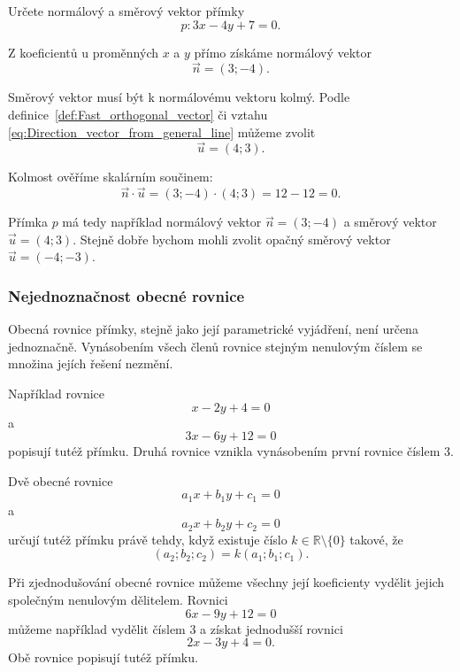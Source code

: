 \begin{example}\label{exa:Vectors_from_general_line}
    Určete normálový a směrový vektor přímky
    \[
        p: 3x-4y+7=0.
    \]

    Z koeficientů u proměnných $x$ a $y$ přímo získáme normálový
    vektor
    \[
        \vec{n}=(3;-4).
    \]

    Směrový vektor musí být k normálovému vektoru kolmý. 
    Podle definice~\ref{def:Fast_orthogonal_vector} 
    či vztahu \eqref{eq:Direction_vector_from_general_line} můžeme zvolit
    \[
        \vec{u}=(4;3).
    \]

    Kolmost ověříme skalárním součinem:
    \[
        \vec{n}\cdot\vec{u}
        =
        (3;-4)\cdot(4;3)
        =
        12-12
        =
        0.
    \]

    Přímka $p$ má tedy například normálový vektor
    $\vec{n}=(3;-4)$ a směrový vektor $\vec{u}=(4;3)$. Stejně dobře
    bychom mohli zvolit opačný směrový vektor $\vec{u}=(-4;-3)$.
\end{example}

\subsubsection{Nejednoznačnost obecné rovnice}
\label{subsubsec:Nonunique_general_line_equation}

Obecná rovnice přímky, stejně jako její parametrické vyjádření, není
určena jednoznačně. Vynásobením všech členů rovnice stejným nenulovým
číslem se množina jejích řešení nezmění.

Například rovnice
\[
    x-2y+4=0
\]
a
\[
    3x-6y+12=0
\]
popisují tutéž přímku. Druhá rovnice vznikla vynásobením první
rovnice číslem $3$.

Dvě obecné rovnice
\[
    a_1x+b_1y+c_1=0
\]
a
\[
    a_2x+b_2y+c_2=0
\]
určují tutéž přímku právě tehdy, když existuje číslo
$k\in\mathbb{R}\setminus\{0\}$ takové, že
\[
    (a_2;b_2;c_2)=k(a_1;b_1;c_1).
\]

\begin{remark}
    Při zjednodušování obecné rovnice můžeme všechny její koeficienty
    vydělit jejich společným nenulovým dělitelem. Rovnici
    \[
        6x-9y+12=0
    \]
    můžeme například vydělit číslem $3$ a získat jednodušší rovnici
    \[
        2x-3y+4=0.
    \]
    Obě rovnice popisují tutéž přímku.
\end{remark}

